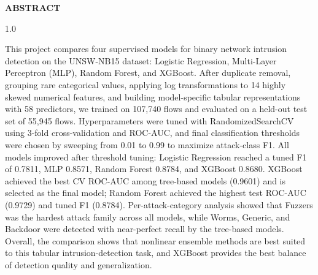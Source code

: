 \begin{center}
{\Large \textbf{ABSTRACT}}
\end{center}
\small
\begin{spacing}{1.0}

This project compares four supervised models for binary network intrusion
detection on the UNSW-NB15 dataset: Logistic Regression, Multi-Layer
Perceptron (MLP), Random Forest, and XGBoost. After duplicate removal,
grouping rare categorical values, applying log transformations to 14 highly
skewed numerical features, and building model-specific tabular representations
with 58 predictors, we trained on 107{,}740 flows and evaluated on a held-out
test set of 55{,}945 flows. Hyperparameters were tuned with RandomizedSearchCV
using 3-fold cross-validation and ROC-AUC, and final classification thresholds
were chosen by sweeping from 0.01 to 0.99 to maximize attack-class F1. All
models improved after threshold tuning: Logistic Regression reached a tuned F1
of 0.7811, MLP 0.8571, Random Forest 0.8784, and XGBoost 0.8680. XGBoost
achieved the best CV ROC-AUC among tree-based models (0.9601) and is selected
as the final model; Random Forest achieved the highest test ROC-AUC (0.9729)
and tuned F1 (0.8784). Per-attack-category analysis showed that Fuzzers was
the hardest attack family across all models, while Worms, Generic, and Backdoor
were detected with near-perfect recall by the tree-based models. Overall, the
comparison shows that nonlinear ensemble methods are best suited to this tabular
intrusion-detection task, and XGBoost provides the best balance of detection
quality and generalization.
\end{spacing}

\vspace{1em}
